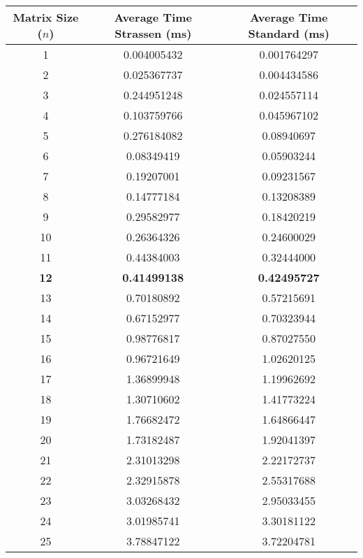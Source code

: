 \documentclass[11pt]{scrartcl}
\theoremstyle{dotlessP}
\theoremstyle{dotlessN}
\theoremstyle{dotN}
\begin{document}
\begin{table}[H]
\begin{subtable}{0.5\textwidth}
{\begin{tabular}{c|c|c}
       Matrix Size
       ($n$) & Average Time Strassen (ms) & Average Time Standard (ms) \\
\hline
       1 & 0.004005432 & 0.001764297 \\
         2 & 0.025367737 & 0.004434586 \\
            3 & 0.244951248 & 0.024557114 \\
            4 & 0.103759766 & 0.045967102 \\
            5 & 0.276184082 & 0.08940697 \\
            6 & 0.08349419 & 0.05903244 \\
            7 & 0.19207001 & 0.09231567 \\
            8 & 0.14777184 & 0.13208389 \\
            9 & 0.29582977 & 0.18420219 \\
            10 & 0.26364326 & 0.24600029 \\
            11 & 0.44384003 & 0.32444000 \\
            \textbf{12} & \textbf{0.41499138} & \textbf{0.42495727} \\
            13 & 0.70180892 & 0.57215691 \\
            14 & 0.67152977 & 0.70323944 \\
            15 & 0.98776817 & 0.87027550 \\
            16 & 0.96721649 & 1.02620125 \\
            17 & 1.36899948 & 1.19962692 \\
            18 & 1.30710602 & 1.41773224 \\
            19 & 1.76682472 & 1.64866447 \\
            20 & 1.73182487 & 1.92041397 \\
            21 & 2.31013298 & 2.22172737 \\
            22 & 2.32915878 & 2.55317688 \\
            23 & 3.03268432 & 2.95033455 \\
            24 & 3.01985741 & 3.30181122 \\
            25 & 3.78847122 & 3.72204781 \\
    \end{tabular}}
    \end{subtable}
    \begin{subtable}{0.5\textwidth}
\end{subtable}
\end{table}
\end{document}
